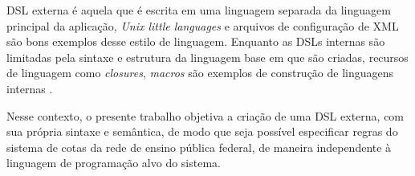 \begin{citacao} 
\gls{DSL} externa é aquela que é escrita em uma linguagem separada da linguagem principal da aplicação, \textit{Unix little languages} e arquivos de configuração de \gls{XML} são bons exemplos desse estilo de linguagem. Enquanto as \gls{DSL}s internas são limitadas pela sintaxe e estrutura da linguagem base em que são criadas, recursos de linguagem como \textit{closures}, \textit{macros} são exemplos de construção de linguagens internas \cite[s/p, tradução nossa]{fowler2005language}.
\end{citacao}


Nesse contexto, o presente trabalho objetiva a criação de uma \gls{DSL} externa, com sua própria sintaxe e semântica, de modo que seja possível especificar regras do sistema de cotas da rede de ensino pública federal, de maneira independente à linguagem de programação alvo do sistema. 



